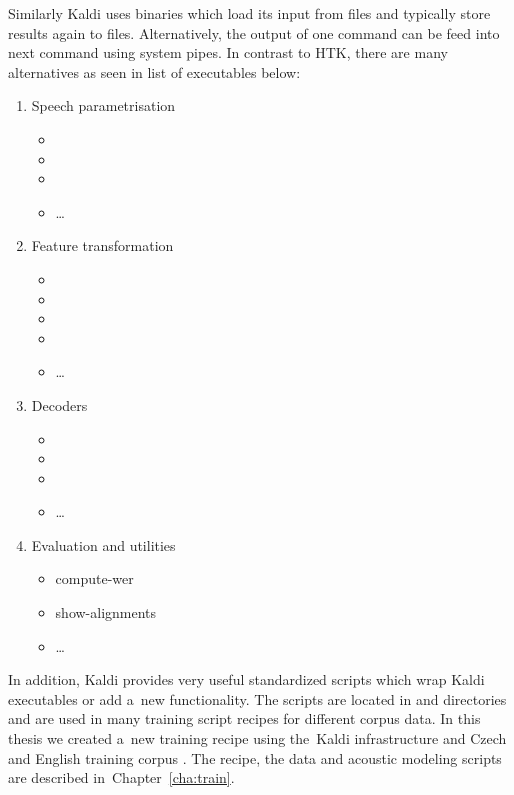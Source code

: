 {Similarly Kaldi uses binaries which load its input from files and typically store results again to files.
Alternatively, the output of one command can be feed into next command using system pipes.
In contrast to \ac{HTK}, there are many alternatives as seen in list of executables below:
\begin{enumerate}
    \item Speech parametrisation
        \begin{itemize}
            \item {}
            \item {}
            \item {}
            \item \ldots
        \end{itemize}
    \item Feature transformation
        \begin{itemize}
            \item {}
            \item {}
            \item {}
            \item {}
            \item \ldots
        \end{itemize}
    \item Decoders
        \begin{itemize}
            \item {}
            \item {}
            \item {}
            \item \ldots
        \end{itemize}
    \item Evaluation and utilities
        \begin{itemize}
            \item compute-wer
            \item show-alignments
            \item \ldots
        \end{itemize}
\end{enumerate}
In addition, Kaldi provides very useful standardized scripts which wrap Kaldi executables or add a~new functionality. 
The scripts are located in  and  directories and are used in many training script recipes for different corpus data.
In this thesis we created a~new training recipe using the~Kaldi infrastructure and Czech and English training corpus \cite{korvas_2014}.
The recipe, the data and acoustic modeling scripts are described in~Chapter~\ref{cha:train}.

}

